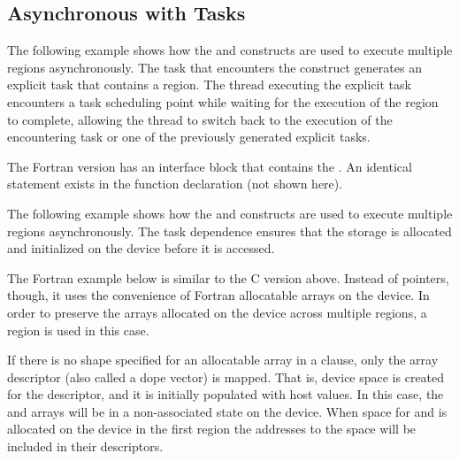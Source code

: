 \subsection{Asynchronous  with Tasks}
\label{subsec:async_target_with_tasks}



The following example shows how the  and  constructs 
are used to execute multiple  regions asynchronously. The task that 
encounters the  construct generates an explicit task that contains 
a  region. The thread executing the explicit task encounters a task 
scheduling point while waiting for the execution of the  region 
to complete, allowing the thread to switch back to the execution of the encountering 
task or one of the previously generated explicit tasks.


\pagebreak
{}
The Fortran version has an interface block that contains the . 
An identical statement exists in the function declaration (not shown here).


The following example shows how the  and  constructs 
are used to execute multiple  regions asynchronously. The task dependence 
ensures that the storage is allocated and initialized on the device before it is 
accessed.


The Fortran example below is similar to the C version above. Instead of pointers, though, it uses
the convenience of Fortran allocatable arrays on the device. In order to preserve the arrays 
allocated on the device across multiple  regions, a  region 
is used in this case.

If there is no shape specified for an allocatable array in a  clause, only the array descriptor
(also called a dope vector) is mapped. That is, device space is created for the descriptor, and it
is initially populated with host values. In this case, the  and  arrays will be in a
non-associated state on the device. When space for  and  is allocated on the device
in the first  region the addresses to the space will be included in their descriptors.

